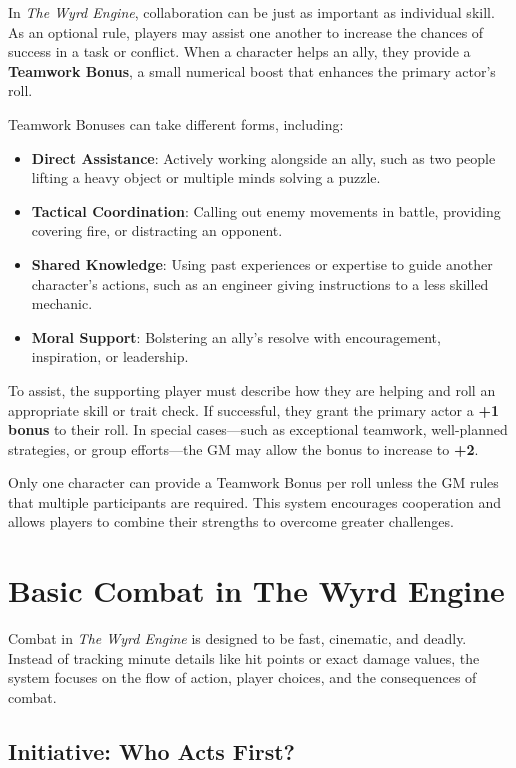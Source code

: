 In \textit{The Wyrd Engine}, collaboration can be just as important as individual skill. As an optional rule, players may assist one another to increase the chances of success in a task or conflict. When a character helps an ally, they provide a \textbf{Teamwork Bonus}, a small numerical boost that enhances the primary actor’s roll.  

Teamwork Bonuses can take different forms, including:  

\begin{itemize}
    \item \textbf{Direct Assistance}: Actively working alongside an ally, such as two people lifting a heavy object or multiple minds solving a puzzle.  
    \item \textbf{Tactical Coordination}: Calling out enemy movements in battle, providing covering fire, or distracting an opponent.  
    \item \textbf{Shared Knowledge}: Using past experiences or expertise to guide another character’s actions, such as an engineer giving instructions to a less skilled mechanic.  
    \item \textbf{Moral Support}: Bolstering an ally’s resolve with encouragement, inspiration, or leadership.  
\end{itemize}

To assist, the supporting player must describe how they are helping and roll an appropriate skill or trait check. If successful, they grant the primary actor a \textbf{+1 bonus} to their roll. In special cases—such as exceptional teamwork, well-planned strategies, or group efforts—the GM may allow the bonus to increase to \textbf{+2}.  

Only one character can provide a Teamwork Bonus per roll unless the GM rules that multiple participants are required. This system encourages cooperation and allows players to combine their strengths to overcome greater challenges.

\section{Basic Combat in The Wyrd Engine}

Combat in \textit{The Wyrd Engine} is designed to be fast, cinematic, and deadly. Instead of tracking minute details like hit points or exact damage values, the system focuses on the flow of action, player choices, and the consequences of combat.

\subsection{Initiative: Who Acts First?}

